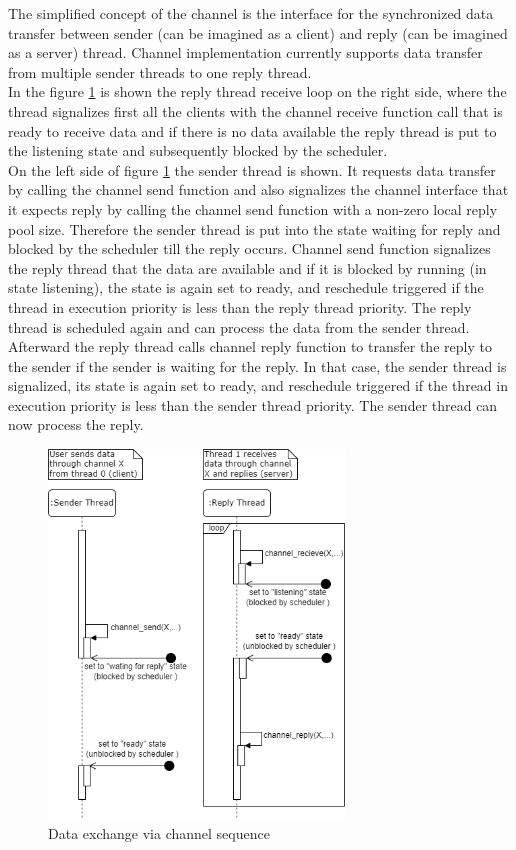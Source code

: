 \indent The simplified concept of the channel is the interface for the synchronized data transfer between sender (can be imagined as a client) and reply (can be imagined as a server) thread. Channel implementation currently supports data transfer from multiple sender threads to one reply thread. \\
\indent In the figure \ref{fig:channel} is shown the reply thread receive loop on the right side, where the thread signalizes first all the clients with the channel receive function call that is ready to receive data and if there is no data available the reply thread is put to the listening state and subsequently blocked by the scheduler. \\ 
\indent On the left side of figure \ref{fig:channel} the sender thread is shown. It requests data transfer by calling the channel send function and also signalizes the channel interface that it expects reply by calling the channel send function with a non-zero local reply pool size. Therefore the sender thread is put into the state waiting for reply and blocked by the scheduler till the reply occurs. Channel send function signalizes the reply thread that the data are available and if it is blocked by running (in state listening), the state is again set to ready, and reschedule triggered if the thread in execution priority is less than the reply thread priority. The reply thread is scheduled again and can process the data from the sender thread. Afterward the reply thread calls channel reply function to transfer the reply to the sender if the sender is waiting for the reply. In that case, the sender thread is signalized, its state is again set to ready, and reschedule triggered if the thread in execution priority is less than the sender thread priority. The sender thread can now process the reply.
\begin{figure}[H]
\begin{center}
\includegraphics[width=0.7\textwidth]{images/channel.png}
\caption{Data exchange via channel sequence}
\label{fig:channel}
\end{center}
\end{figure}

